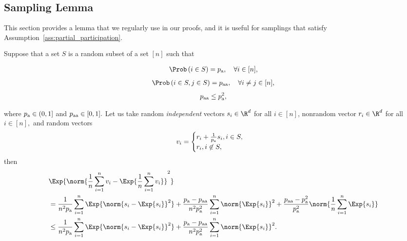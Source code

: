 \documentclass{article}
\newcommand*{\probavailable}{\ensuremath{p_{\textnormal{a}}}}
\newcommand*{\probpairaa}{\ensuremath{p_{\textnormal{aa}}}}
\begin{document}
\subsection{Sampling Lemma}
This section provides a lemma that we regularly use in our proofs, and it is useful for samplings that satisfy Assumption~\ref{ass:partial_participation}.
\begin{lemma}
  \label{lemma:sampling}
  Suppose that a set $S$ is a random subset of a set $[n]$ such that
  \begin{enumerate}
    \Item \begin{align*}\Prob\left(i \in S\right) = \probavailable, \quad \forall i \in [n],\end{align*}
    \Item \begin{align*}\Prob\left(i \in S, j \in S\right) = \probpairaa, \quad \forall i \neq j \in [n],\end{align*}
    \Item \begin{align*}
      \probpairaa \leq \probavailable^2,
    \end{align*}
  \end{enumerate}
  where $\probavailable \in (0, 1]$ and $\probpairaa \in [0, 1].$ Let us take random \textit{independent} vectors $s_i \in \R^d$ for all $i \in [n]$, nonrandom vector $r_i \in \R^d$ for all $i \in [n],$ and random vectors
  \begin{align*}
    v_i = \begin{cases}
      r_i + \frac{1}{\probavailable} s_i, i \in S, \\
      r_i, i \not\in S,
    \end{cases}
  \end{align*}
  then
  \begin{align*}
    &\Exp{\norm{\frac{1}{n}\sum_{i=1}^n v_i - \Exp{\frac{1}{n}\sum_{i=1}^n v_i}}^2} \\
    &= \frac{1}{n^2 \probavailable}\sum_{i=1}^n\Exp{\norm{s_i - \Exp{s_i}}^2} +\frac{\probavailable - \probpairaa}{n^2 \probavailable^2}\sum_{i=1}^n\norm{\Exp{s_i}}^2 + \frac{\probpairaa - \probavailable^2}{\probavailable^2}\norm{\frac{1}{n}\sum_{i=1}^n\Exp{s_i}}\\
    &\leq \frac{1}{n^2 \probavailable}\sum_{i=1}^n\Exp{\norm{s_i - \Exp{s_i}}^2} +\frac{\probavailable - \probpairaa}{n^2 \probavailable^2}\sum_{i=1}^n\norm{\Exp{s_i}}^2.
  \end{align*}
\end{lemma}
\end{document}
